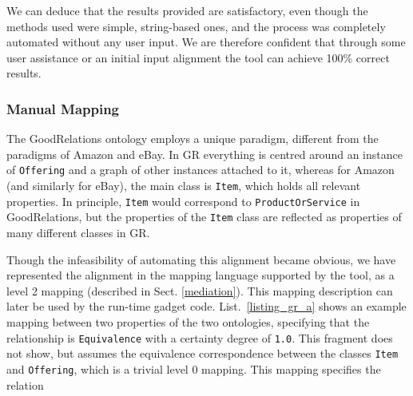 We can deduce that the results provided are satisfactory, even though the methods used were simple, string-based ones, and the process was completely automated without any user input.
We are therefore confident that through some user assistance or an initial input alignment the tool can achieve 100\% correct results.



\subsubsection{Manual Mapping} %
\label{sub:manual_mapping}

The GoodRelations ontology employs a unique paradigm, different from the paradigms of Amazon and eBay. In GR everything is centred around an instance of \texttt{Offering} and a graph of other instances attached to it, whereas for Amazon (and similarly for eBay), the main class is \texttt{Item}, which holds all relevant properties. In principle, \texttt{Item} would correspond to \texttt{ProductOrService} in GoodRelations, but the properties of the \texttt{Item} class are reflected as properties of many different classes in GR. 

Though the infeasibility of automating this alignment became obvious, we have represented the alignment in the mapping language supported by the tool, as a level 2 mapping (described in Sect. \ref{mediation}).
This mapping description can later be used by the run-time gadget code. List.~\ref{listing_gr_a} shows an example mapping between two properties of the two ontologies, specifying that the relationship is \texttt{Equivalence} with a certainty degree of \texttt{1.0}. This fragment does not show, but assumes the equivalence correspondence between the classes \texttt{Item} and \texttt{Offering}, which is a trivial level 0 mapping. This mapping specifies the relation

